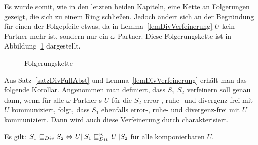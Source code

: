 Es wurde somit, wie in den letzten beiden Kapiteln, eine Kette an Folgerungen
gezeigt, die sich zu einem Ring schließen. Jedoch ändert sich an der Begründung
für einen der Folgepfeile etwas, da in Lemma~\ref{lemDivVerfeinerung} $U$ kein
Partner mehr ist, sondern nur ein $\omega$-Partner. Diese Folgerungskette ist in
Abbildung~\ref{FolgerungsketteDiv} dargestellt.

\begin{figure}[h!tbp]
  \begin{center}
    \caption{Folgerungskette}
\label{FolgerungsketteDiv}
  \end{center}
\end{figure}

Aus Satz~\ref{satzDivFullAbst} und Lemma~\ref{lemDivVerfeinerung} erhält man
das folgende Korollar. Angenommen man definiert, dass $S_1$ $S_2$ verfeinern
soll genau dann, wenn für alle $\omega$-Partner \EIO{}s $U$ für die $S_2$ error-,
ruhe- und divergenz-frei mit $U$ kommuniziert, folgt, dass $S_1$ ebenfalls
error-, ruhe- und divergenz-frei mit $U$ kommuniziert. Dann wird auch diese
Verfeinerung durch \DRel{} charakterisiert.

\begin{kor}
  Es gilt: $S_1\sqsubseteq _{Div}{} S_2 \Leftrightarrow U\|S_1\sqsubseteq _{Div}^\mathrm{B}{} U\|S_2$ für alle
  komponierbaren $U$.
\end{kor}

